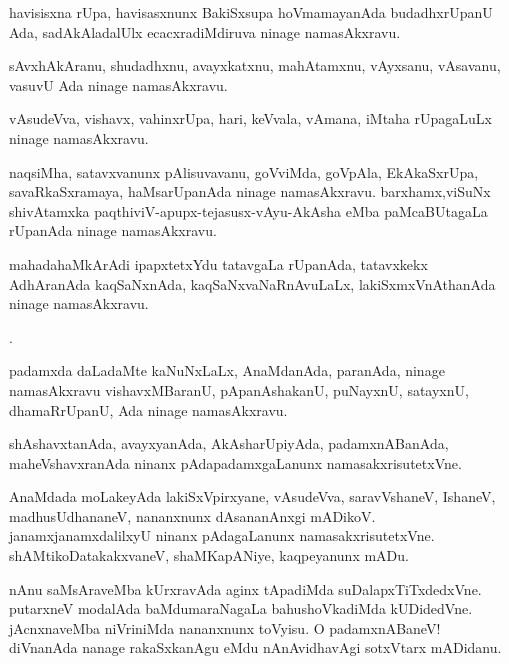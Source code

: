 \documentclass{article}
\begin{document}
\begin{mn}
havisisxna rUpa,  havisasxnunx BakiSxsupa  hoVmamayanAda budadhxrUpanU 
Ada, sadAkAladalUlx ecacxradiMdiruva ninage namasAkxravu.
\end{mn}

\begin{mn}
sAvxhAkAranu, shudadhxnu, avayxkatxnu, mahAtamxnu, vAyxsanu, vAsavanu, vasuvU Ada ninage namasAkxravu.
\end{mn}

\begin{mn}
vAsudeVva, vishavx, vahinxrUpa, hari, keVvala, vAmana, iMtaha rUpagaLuLx ninage namasAkxravu.   
\end{mn}

\begin{mn}
naqsiMha, satavxvanunx  pAlisuvavanu, goVviMda, goVpAla, EkAkaSxrUpa, savaRkaSxramaya, 
haMsarUpanAda ninage namasAkxravu.  barxhamx,viSuNx shivAtamxka 
paqthiviV-apupx-tejasusx-vAyu-AkAsha eMba paMcaBUtagaLa rUpanAda ninage namasAkxravu.   
\end{mn}

\begin{mn}
mahadahaMkArAdi  ipapxtetxYdu tatavgaLa rUpanAda, tatavxkekx AdhAranAda 
kaqSaNxnAda, kaqSaNxvaNaRnAvuLaLx, lakiSxmxVnAthanAda ninage namasAkxravu. 
\end{mn}. 

\begin{mn}
padamxda daLadaMte kaNuNxLaLx, AnaMdanAda, paranAda, ninage namasAkxravu
vishavxMBaranU, pApanAshakanU, puNayxnU, satayxnU, dhamaRrUpanU, Ada ninage namasAkxravu.
\end{mn}

\begin{mn}
shAshavxtanAda, avayxyanAda, AkAsharUpiyAda, padamxnABanAda, maheVshavxranAda 
ninanx pAdapadamxgaLanunx namasakxrisutetxVne.
\end{mn}

\begin{mn}
AnaMdada moLakeyAda lakiSxVpirxyane, vAsudeVva, saravVshaneV, IshaneV, madhusUdhananeV, 
 nananxnunx dAsananAnxgi mADikoV. janamxjanamxdalilxyU ninanx pAdagaLanunx
 namasakxrisutetxVne.  shAMtikoDatakakxvaneV, shaMKapANiye, kaqpeyanunx mADu.
\end{mn}

\begin{mn}
nAnu saMsAraveMba kUrxravAda aginx tApadiMda suDalapxTiTxdedxVne. putarxneV modalAda 
baMdumaraNagaLa bahushoVkadiMda kUDidedVne. jAcnxnaveMba niVriniMda nananxnunx 
toVyisu.  O padamxnABaneV! diVnanAda nanage rakaSxkanAgu eMdu nAnAvidhavAgi sotxVtarx mADidanu.
\end{mn}
\end{document}
